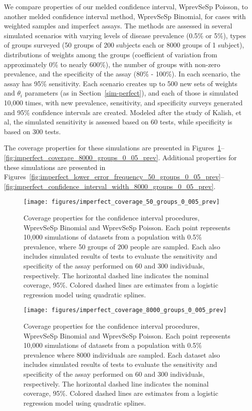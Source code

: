We compare properties of our melded confidence interval, WprevSeSp Poisson, to another melded confidence interval method, WprevSeSp Binomial, for cases with weighted samples and imperfect assays.
The methods are assessed in several simulated scenarios with varying levels of disease prevalence (0.5\% or 5\%), types of groups surveyed (50 groups of 200 subjects each or 8000 groups of 1 subject), distributions of weights among the groups (coefficient of variation from approximately 0\% to nearly 600\%), the number of groups with non-zero prevalence, and the specificity of the assay (80\% - 100\%).
In each scenario, the assay has 95\% sensitivity.
Each scenario creates up to 500 new sets of weights and $\theta_i$ parameters (as in Section~\ref{sim-perfect}), and each of those is simulated 10,000 times, with new prevalence, sensitivity, and specificity surveys generated and 95\% confidence intervals are created.
Modeled after the study of Kalish, et al,\cite{Kali:2021} the simulated sensitivity is assessed based on 60 tests, while specificity is based on 300 tests.

The coverage properties for these simulations are presented in Figures~\ref{fig:imperfect_coverage_50_groups_0_005_prev}--\ref{fig:imperfect_coverage_8000_groups_0_05_prev}.
Additional properties for these simulations are presented in Figures~\ref{fig:imperfect_lower_error_frequency_50_groups_0_05_prev}--\ref{fig:imperfect_confidence_interval_width_8000_groups_0_05_prev}.

\begin{figure}
\centering
\texttt{[image: figures/imperfect\_coverage\_50\_groups\_0\_005\_prev]}
\caption{Coverage properties for the confidence interval procedures, WprevSeSp Binomial and WprevSeSp Poisson.
Each point represents 10,000 simulations of datasets from a population with 0.5\% prevalence, where 50 groups of 200 people are sampled.
Each  also includes simulated results of tests to evaluate the sensitivity and specificity of the assay performed on 60 and 300 individuals, respectively.
The horizontal dashed line indicates the nominal coverage, 95\%.
Colored dashed lines are estimates from a logistic regression model using quadratic splines.}
\label{fig:imperfect_coverage_50_groups_0_005_prev}
\end{figure}

\begin{figure}
\centering
\texttt{[image: figures/imperfect\_coverage\_8000\_groups\_0\_005\_prev]}
\caption{Coverage properties for the confidence interval procedures, WprevSeSp Binomial and WprevSeSp Poisson.
Each point represents 10,000 simulations of datasets from a population with 0.5\% prevalence where 8000 individuals are sampled.
Each dataset also includes simulated results of tests to evaluate the sensitivity and specificity of the assay performed on 60 and 300 individuals, respectively.
The horizontal dashed line indicates the nominal coverage, 95\%.
Colored dashed lines are estimates from a logistic regression model using quadratic splines.}
\label{fig:imperfect_coverage_8000_groups_0_005_prev}
\end{figure}

